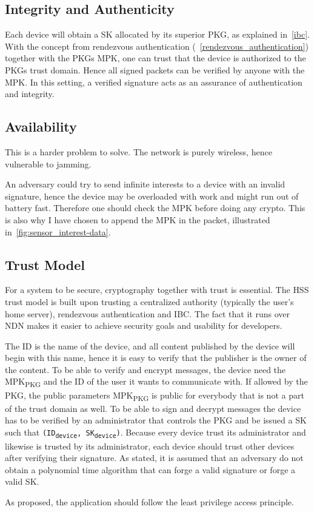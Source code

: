 \subsection{Integrity and Authenticity}
Each device will obtain a \gls{SK} allocated by its superior \gls{PKG}, as explained in~\autoref{ibc}.
With the concept from rendezvous authentication (~\autoref{rendezvous_authentication}) together with the \gls{PKG}s \gls{MPK}, one can trust that the device is authorized to the \gls{PKG}s trust domain. 
Hence all signed packets can be verified by anyone with the \gls{MPK}.
In this setting, a verified signature acts as an assurance of authentication and integrity. 


\subsection{Availability}
This is a harder problem to solve.
The network is purely wireless, hence vulnerable to jamming. 

An adversary could try to send infinite \gls{interest}s to a device with an invalid signature, hence the device may be overloaded with work and might run out of battery fast.
Therefore one should check the \gls{MPK} before doing any crypto.
This is also why I have chosen to append the MPK in the packet, illustrated in~\autoref{fig:sensor_interest-data}. 

\subsection{Trust Model}
For a system to be secure, cryptography together with trust is essential. 
The \gls{HSS} trust model is built upon trusting a centralized authority (typically the user's home server), rendezvous authentication and \gls{IBC}.
The fact that it runs over \gls{NDN} makes it easier to achieve security goals and usability for developers.

The \gls{ID} is the \gls{name} of the device, and all content published by the device will begin with this \gls{name}, hence it is easy to verify that the \gls{publisher} is the owner of the content.
To be able to verify and encrypt messages, the device need the MPK\textsubscript{PKG} and the ID of the user it wants to communicate with. 
If allowed by the PKG, the public parameters MPK\textsubscript{PKG} is public for everybody that is not a part of the trust domain as well. 
To be able to sign and decrypt messages the device has to be verified by an administrator that controls the \gls{PKG} and be issued a \gls{SK} such that \texttt{(ID\textsubscript{device}, SK\textsubscript{device})}. 
Because every device trust its administrator and likewise is trusted by its administrator, each device should trust other devices after verifying their signature.
As stated, it is assumed that an adversary do not obtain a polynomial time algorithm that can forge a valid signature or forge a valid \gls{SK}.

As proposed, the application should follow the least privilege access principle.
